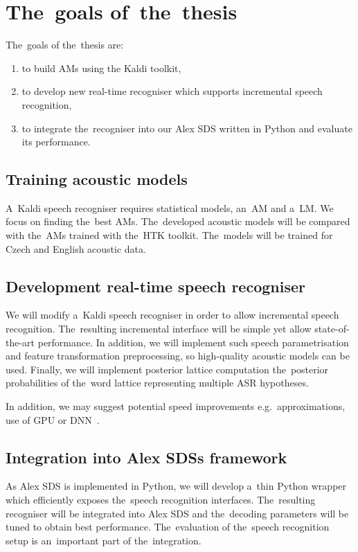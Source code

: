 \section{The~goals of~the~thesis} 
\label{sec:goals}
The~goals of the~thesis are:
\begin{enumerate}
    \item to build \acp{AM} using the Kaldi toolkit,
    \item to develop new real-time recogniser which supports incremental speech recognition,
    \item to integrate the~recogniser into our Alex \ac{SDS} written in Python and evaluate its performance.
\end{enumerate}

\subsection{Training acoustic models} 
\label{sub:training_kaldi_acoustic_models}
A~Kaldi speech recogniser requires statistical models, an~\acl{AM} and a~\acl{LM}. 
We focus on finding the~best \aclp{AM}. 
The~developed acoustic models will be compared with the~\acp{AM} trained with the~\ac{HTK} toolkit. 
The~models will be trained for Czech and English acoustic data.

\subsection{Development real-time speech recogniser} 
\label{sub:compare_rt}

We will modify a~Kaldi speech recogniser in order to allow incremental speech recognition.
The~resulting incremental interface will be simple yet allow state-of-the-art performance.
In addition, we will implement such speech parametrisation and feature transformation preprocessing, so high-quality acoustic models can be used.
Finally, we will implement posterior lattice computation the~posterior probabilities of the~word lattice representing multiple \ac{ASR} hypotheses.


In addition, we may suggest potential speed improvements e.g.\ approximations, use of \ac{GPU} or \ac{DNN}~\cite{vesely2013sequencediscriminative}.

\subsection[Integration into Alex \acsp{SDS} framework]{Integration into Alex \aclp{SDS} framework} 
\label{sub:integration}
As Alex \acs{SDS} is implemented in Python, we will develop a~thin Python wrapper which efficiently exposes the~speech recognition interfaces.
The~resulting recogniser will be integrated into Alex \ac{SDS} and the~decoding parameters will be tuned to obtain best performance.
The~evaluation of the~speech recognition setup is an~important part of the~integration.

